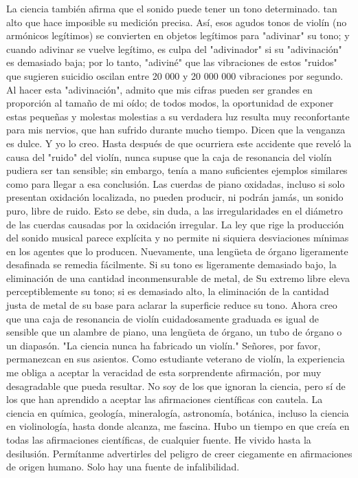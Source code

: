 La ciencia también afirma que el sonido puede tener un tono determinado.
tan alto que hace imposible su medición precisa. Así, esos agudos tonos de violín (no armónicos legítimos) se convierten en objetos legítimos para "adivinar" su tono; y cuando adivinar se vuelve legítimo, es culpa del "adivinador" si su "adivinación" es demasiado baja; por lo tanto, "adiviné" que las vibraciones de estos "ruidos" que sugieren suicidio oscilan entre 20 000 y 20 000 000 vibraciones por segundo. Al hacer esta "adivinación", admito que mis cifras pueden ser grandes en proporción al tamaño de mi oído; de todos modos, la oportunidad de exponer estas pequeñas y molestas molestias a su verdadera luz resulta muy reconfortante para mis nervios, que han sufrido durante mucho tiempo.
Dicen que la venganza es dulce. Y yo lo creo.
Hasta después de que ocurriera este accidente que reveló la causa del "ruido" del violín, nunca supuse que la caja de resonancia del violín pudiera ser tan sensible; sin embargo, tenía a mano suficientes ejemplos similares como para llegar a esa conclusión.
Las cuerdas de piano oxidadas, incluso si solo presentan oxidación localizada, no pueden producir, ni podrán jamás, un sonido puro, libre de ruido. Esto se debe, sin duda, a las irregularidades en el diámetro de las cuerdas causadas por la oxidación irregular. La ley que rige la producción del sonido musical parece explícita y no permite ni siquiera desviaciones mínimas en los agentes que lo producen.
Nuevamente, una lengüeta de órgano ligeramente desafinada se remedia fácilmente. Si su tono es ligeramente demasiado bajo, la eliminación de una cantidad inconmensurable de metal, de
Su extremo libre eleva perceptiblemente su tono; si es demasiado alto, la eliminación de la cantidad justa de metal de su base para aclarar la superficie reduce su tono.
Ahora creo que una caja de resonancia de violín cuidadosamente graduada es igual de sensible que un alambre de piano, una lengüeta de órgano, un tubo de órgano o un diapasón.
"La ciencia nunca ha fabricado un violín."
Señores, por favor, permanezcan en sus asientos.
Como estudiante veterano de violín, la experiencia me obliga a aceptar la veracidad de esta sorprendente afirmación, por muy desagradable que pueda resultar. No soy de los que ignoran la ciencia, pero sí de los que han aprendido a aceptar las afirmaciones científicas con cautela. La ciencia en química, geología, mineralogía, astronomía, botánica, incluso la ciencia en violinología, hasta donde alcanza, me fascina. Hubo un tiempo en que creía en todas las afirmaciones científicas, de cualquier fuente. He vivido hasta la desilusión. Permítanme advertirles del peligro de creer ciegamente en afirmaciones de origen humano. Solo hay una fuente de infalibilidad.

